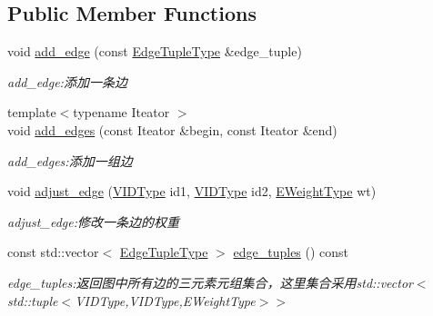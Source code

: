 \subsection*{Public Member Functions}
\begin{DoxyCompactItemize}
\item 
void \hyperlink{struct_introdunction_to_algorithm_1_1_graph_algorithm_1_1_a_d_j_list_graph_a81ccebaa8bedc002ed21ac2df31bd952}{add\+\_\+edge} (const \hyperlink{struct_introdunction_to_algorithm_1_1_graph_algorithm_1_1_a_d_j_list_graph_ad84ed29dc772f53561f644c091dd642e}{Edge\+Tuple\+Type} \&edge\+\_\+tuple)
\begin{DoxyCompactList}\small\item\em add\+\_\+edge\+:添加一条边 \end{DoxyCompactList}\item 
{\footnotesize template$<$typename Iteator $>$ }\\void \hyperlink{struct_introdunction_to_algorithm_1_1_graph_algorithm_1_1_a_d_j_list_graph_aed7a4f48f04b78da3152e901024d1e96}{add\+\_\+edges} (const Iteator \&begin, const Iteator \&end)
\begin{DoxyCompactList}\small\item\em add\+\_\+edges\+:添加一组边 \end{DoxyCompactList}\item 
void \hyperlink{struct_introdunction_to_algorithm_1_1_graph_algorithm_1_1_a_d_j_list_graph_a9128416d893da4085332e6e532f0bbb2}{adjust\+\_\+edge} (\hyperlink{struct_introdunction_to_algorithm_1_1_graph_algorithm_1_1_a_d_j_list_graph_aaa2c152e1ccafbe5556a15141d9d31b2}{V\+I\+D\+Type} id1, \hyperlink{struct_introdunction_to_algorithm_1_1_graph_algorithm_1_1_a_d_j_list_graph_aaa2c152e1ccafbe5556a15141d9d31b2}{V\+I\+D\+Type} id2, \hyperlink{struct_introdunction_to_algorithm_1_1_graph_algorithm_1_1_a_d_j_list_graph_ae178ce485958d261c40b7beb8dfe9d0a}{E\+Weight\+Type} wt)
\begin{DoxyCompactList}\small\item\em adjust\+\_\+edge\+:修改一条边的权重 \end{DoxyCompactList}\item 
const std\+::vector$<$ \hyperlink{struct_introdunction_to_algorithm_1_1_graph_algorithm_1_1_a_d_j_list_graph_ad84ed29dc772f53561f644c091dd642e}{Edge\+Tuple\+Type} $>$ \hyperlink{struct_introdunction_to_algorithm_1_1_graph_algorithm_1_1_a_d_j_list_graph_aff1c916500c0b4a9d2c4d22f7e095368}{edge\+\_\+tuples} () const 
\begin{DoxyCompactList}\small\item\em edge\+\_\+tuples\+:返回图中所有边的三元素元组集合，这里集合采用{\ttfamily std\+::vector$<$std\+::tuple$<$V\+I\+D\+Type,V\+I\+D\+Type,E\+Weight\+Type$>$$>$} \end{DoxyCompactList}\item 

\end{DoxyCompactItemize}
